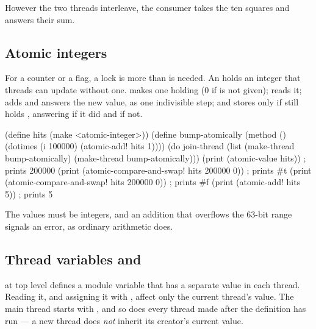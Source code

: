 However the two threads interleave, the consumer takes the ten squares
and answers their sum.

\subsection{Atomic integers}\label{sec:ext-atomic}

For a counter or a flag, a lock is more than is needed. An
 holds an integer that threads can update without
one.  makes one holding
 (0 if  is not given);  reads it;
 adds  and answers the new
value, as one indivisible step; and  stores  only if 
still holds , answering  if it did and  if
not.

\begin{dylan}
(define hits (make <atomic-integer>))
(define bump-atomically
  (method () (dotimes (i 100000) (atomic-add! hits 1))))
(do join-thread (list (make-thread bump-atomically)
                      (make-thread bump-atomically)))
(print (atomic-value hits))                          ; prints 200000
(print (atomic-compare-and-swap! hits 200000 0))     ; prints #t
(print (atomic-compare-and-swap! hits 200000 0))     ; prints #f
(print (atomic-add! hits 5))                         ; prints 5
\end{dylan}

The values must be integers, and an addition that overflows the 63-bit
range signals an error, as ordinary arithmetic does.

\subsection{Thread variables and }
\label{sec:ext-thread-variables}

\begin{quote}
\end{quote}

\noindent at top level defines a module variable that has a separate
value in each thread. Reading it, and assigning it with ,
affect only the current thread's value. The main thread starts with
, and so does every thread made after the definition has run
--- a new thread does \emph{not} inherit its creator's current value.


